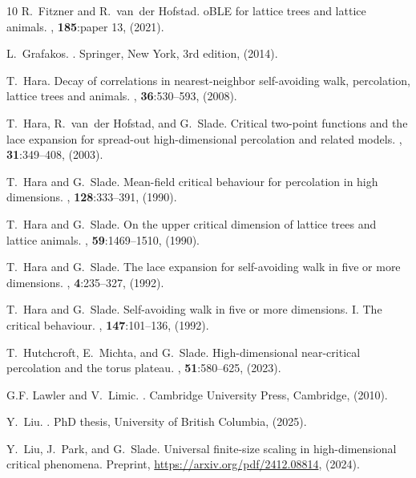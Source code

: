 \documentclass[11pt,hidelinks]{article}
\theoremstyle{plain}
\numberwithin{equation}{section}
\renewcommand{\(}{\left(}
\renewcommand{\)}{\right)}
\newcommand{\1}{\mathds{1}}
\begin{document}
{\begin{thebibliography}{10}
R.~Fitzner and R.~van~der Hofstad.
o{B}{L}{E} for lattice trees and lattice animals.
, {\bf 185}:paper 13, (2021).

L.~Grafakos.
.
\newblock Springer, New York, 3rd edition, (2014).

T.~Hara.
\newblock Decay of correlations in nearest-neighbor self-avoiding walk,
  percolation, lattice trees and animals.
, {\bf 36}:530--593, (2008).

T.~Hara, R.~van~der Hofstad, and G.~Slade.
\newblock Critical two-point functions and the lace expansion for spread-out
  high-dimensional percolation and related models.
, {\bf 31}:349--408, (2003).

T.~Hara and G.~Slade.
\newblock Mean-field critical behaviour for percolation in high dimensions.
, {\bf 128}:333--391, (1990).

T.~Hara and G.~Slade.
\newblock On the upper critical dimension of lattice trees and lattice animals.
, {\bf 59}:1469--1510, (1990).

T.~Hara and G.~Slade.
\newblock The lace expansion for self-avoiding walk in five or more dimensions.
, {\bf 4}:235--327, (1992).

T.~Hara and G.~Slade.
\newblock Self-avoiding walk in five or more dimensions. {I.} {The} critical
  behaviour.
, {\bf 147}:101--136, (1992).

T.~Hutchcroft, E.~Michta, and G.~Slade.
\newblock High-dimensional near-critical percolation and the torus plateau.
, {\bf 51}:580--625, (2023).

G.F. Lawler and V.~Limic.
.
\newblock Cambridge University Press, Cambridge, (2010).

Y.~Liu.
.
\newblock PhD thesis, University of British Columbia, (2025).

Y.~Liu, J.~Park, and G.~Slade.
\newblock Universal finite-size scaling in high-dimensional critical phenomena.
\newblock Preprint, \url{https://arxiv.org/pdf/2412.08814}, (2024).


\end{thebibliography}}
\end{document}
